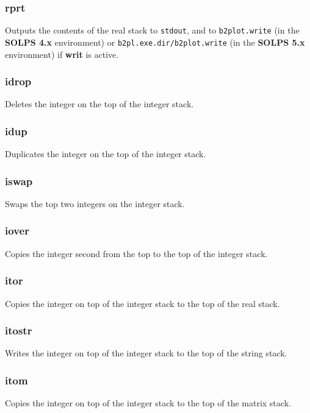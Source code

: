 \documentclass[a4paper,10pt]{report}
\newcommand\SOLPSfour{{\bf SOLPS 4.x} }
\newcommand\SOLPSfive{{\bf SOLPS 5.x} }
\begin{document}
\subsubsection{rprt}\label{sec:rprt}
Outputs the contents of the real stack to \verb:stdout:, and to \verb:b2plot.write:
(in the \SOLPSfour environment) or \verb:b2pl.exe.dir/b2plot.write:
(in the \SOLPSfive environment) if {\bf writ} is active.

\subsubsection{idrop}\label{sec:idrop}
Deletes the integer on the top of the integer stack.

\subsubsection{idup}\label{sec:idup}
Duplicates the integer on the top of the integer stack.

\subsubsection{iswap}\label{sec:iswap}
Swaps the top two integers on the integer stack.

\subsubsection{iover}\label{sec:iover}
Copies the integer second from the top to the top of the integer stack.

\subsubsection{itor}\label{sec:itor}
Copies the integer on top of the integer stack to the top of the real stack.

\subsubsection{itostr}\label{sec:itostr}
Writes the integer on top of the integer stack to the top of the string stack.

\subsubsection{itom}\label{sec:itom}
Copies the integer on top of the integer stack to the top of the matrix stack.
\end{document}
